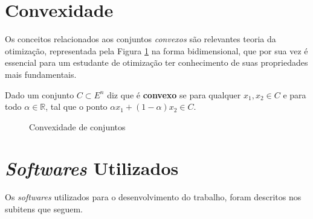 \section{Convexidade}

Os conceitos relacionados aos conjuntos \textit{convexos} são relevantes teoria da otimização, representada pela Figura \ref{fig:convexSet} na forma bidimensional, que por sua vez é essencial para um estudante de otimização ter conhecimento de suas propriedades mais fundamentais. \cite{Luenberger2016, Rocha2009a}

\begin{definicao}
	Dado um conjunto $C\subset E^{n}$ diz que é \textbf{convexo} se para qualquer $x_{1}, x_{2} \in C$ e para todo $\alpha\in\mathbb{R}$, tal que o ponto $\alpha x_{1}+(1-\alpha)x_{2}\in C$.
\end{definicao}

\begin{figure}[H]
	\centering
	\hspace{2cm}
	\caption{Convexidade de conjuntos}
	\label{fig:convexSet}
\end{figure}

\section{\textit{Softwares} Utilizados}

Os \textit{softwares} utilizados para o desenvolvimento do trabalho, foram descritos nos subitens que seguem.


